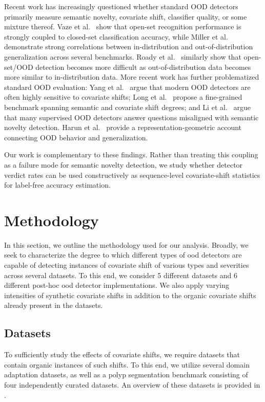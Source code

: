 \documentclass[10pt,twocolumn,letterpaper]{article}
\begin{document}
Recent work has increasingly questioned whether standard OOD detectors primarily measure semantic novelty, covariate shift, classifier quality, or some mixture thereof. Vaze et al.~\cite{vaze2022open} show that open-set recognition performance is strongly coupled to closed-set classification accuracy, while Miller et al.~\cite{miller2021accuracy} demonstrate strong correlations between in-distribution and out-of-distribution generalization across several benchmarks. Roady et al.~\cite{roady2020open} similarly show that open-set/OOD detection becomes more difficult as out-of-distribution data becomes more similar to in-distribution data. More recent work has further problematized standard OOD evaluation: Yang et al.~\cite{yang2024imagenetood} argue that modern OOD detectors are often highly sensitive to covariate shifts; Long et al.~\cite{long2024rethinking} propose a fine-grained benchmark spanning semantic and covariate shift degrees; and Li et al.~\cite{li2025wrongquestions} argue that many supervised OOD detectors answer questions misaligned with semantic novelty detection. Harun et al.~\cite{harun2025neuralcollapse} provide a representation-geometric account connecting OOD behavior and generalization.

Our work is complementary to these findings. Rather than treating this coupling as a failure mode for semantic novelty detection, we study whether detector verdict rates can be used constructively as sequence-level covariate-shift statistics for label-free accuracy estimation.

\section{Methodology}\label{sec:methodology}
In this section, we outline the methodology used for our analysis. Broadly, we seek to characterize the degree to which different types of \gls{ood} detectors are capable of detecting instances of covariate shift of various types and severities across several datasets. To this end, we consider 5 different datasets and 6 different post-hoc \gls{ood} detector implementations. We also apply varying intensities of synthetic covariate shifts in addition to the organic covariate shifts already present in the datasets. 

\subsection{Datasets}
To sufficiently study the effects of covariate shifts, we require datasets that contain organic instances of such shifts. To this end, we utilize several domain adaptation datasets, as well as a polyp segmentation benchmark consisting of four independently curated datasets. An overview of these datasets is provided in .
\begin{table}[!htb]
    \centering
    \caption{Overview of Datasets.}
    
    \label{tab:dataset_table}
\end{table}
\end{document}
